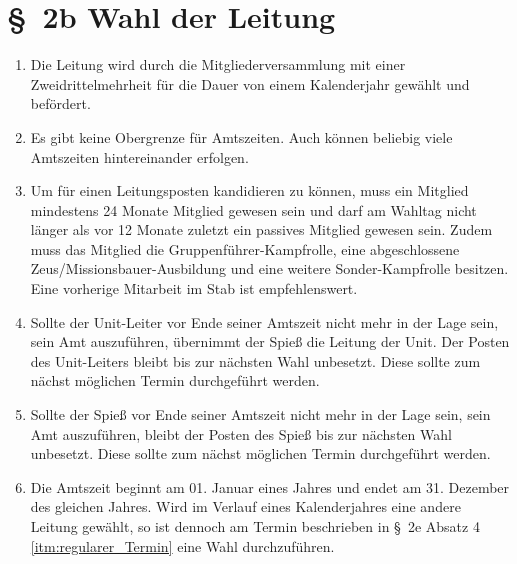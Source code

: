 \section*{\S~2b Wahl der Leitung} 
\label{sec:wahl_derleitung}

\begin{enumerate}[label=(\arabic*)]
    \item Die Leitung wird durch die Mitgliederversammlung mit einer Zweidrittelmehrheit für die Dauer von einem Kalenderjahr gewählt und befördert.
    \item Es gibt keine Obergrenze für Amtszeiten. Auch können beliebig viele Amtszeiten hintereinander erfolgen.
    \item Um für einen Leitungsposten kandidieren zu können, muss ein Mitglied mindestens 24 Monate Mitglied gewesen sein und darf am Wahltag nicht länger als vor 12 Monate zuletzt ein passives Mitglied gewesen sein. Zudem muss das Mitglied die Gruppenführer-Kampfrolle, eine abgeschlossene Zeus/Missionsbauer-Ausbildung und eine weitere Sonder-Kampfrolle besitzen. Eine vorherige Mitarbeit im Stab ist empfehlenswert.
    \item Sollte der Unit-Leiter vor Ende seiner Amtszeit nicht mehr in der Lage sein, sein Amt auszuführen, übernimmt der Spieß die Leitung der Unit. Der Posten des Unit-Leiters bleibt bis zur nächsten Wahl unbesetzt. Diese sollte zum nächst möglichen Termin durchgeführt werden.
    \item Sollte der Spieß vor Ende seiner Amtszeit nicht mehr in der Lage sein, sein Amt auszuführen, bleibt der Posten des Spieß bis zur nächsten Wahl unbesetzt. Diese sollte zum nächst möglichen Termin durchgeführt werden.
    \item Die Amtszeit beginnt am 01. Januar eines Jahres und endet am 31. Dezember des gleichen Jahres. Wird im Verlauf eines Kalenderjahres eine andere Leitung gewählt, so ist dennoch am Termin beschrieben in \S~2e Absatz 4 \ref{itm:regularer_Termin} eine Wahl durchzuführen.
\end{enumerate}
